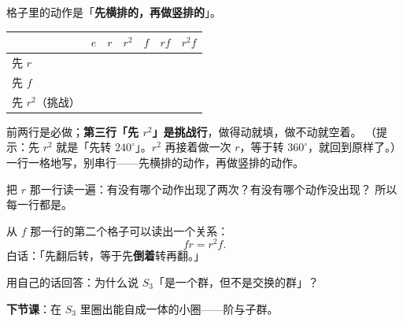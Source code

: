 \begin{dongshou}[只填 \(r\) 行和 \(f\) 行]
  格子里的动作是「\textbf{先横排的，再做竖排的}」。

  \begin{center}
  \begin{tabular}{@{}l|cccccc@{}}
    \toprule
     & \(e\) & \(r\) & \(r^2\) & \(f\) & \(rf\) & \(r^2f\) \\
    \midrule
    \rule{0pt}{2.8ex}先 \(r\) & & & & & & \\
    \midrule
    \rule{0pt}{2.8ex}先 \(f\) & & & & & & \\
    \midrule
    \rule{0pt}{2.8ex}先 \(r^2\)（挑战） & & & & & & \\
    \bottomrule
  \end{tabular}
  \end{center}
  前两行是必做；\textbf{第三行「先 \(r^2\)」是挑战行}，做得动就填，做不动就空着。
  （提示：先 \(r^2\) 就是「先转 \(240^\circ\)」。\(r^2\) 再接着做一次 \(r\)，等于转 \(360^\circ\)，就回到原样了。）
  一行一格地写，别串行——先横排的动作，再做竖排的动作。
\end{dongshou}

\begin{sikao}
  把 \(r\) 那一行读一遍：有没有哪个动作出现了两次？有没有哪个动作没出现？
  所以每一行都是\underline{\hspace{8em}}。
\end{sikao}

\begin{example}
  从 \(f\) 那一行的第二个格子可以读出一个关系：
  \[
    fr=r^2f .
  \]
  白话：「先翻后转，等于先\textbf{倒着}转再翻。」
\end{example}

\begin{xiaojie}
  用自己的话回答：为什么说 \(S_3\)「是一个群，但不是交换的群」？
\end{xiaojie}

\noindent\textbf{下节课}：在 \(S_3\) 里圈出能自成一体的小圈——阶与子群。